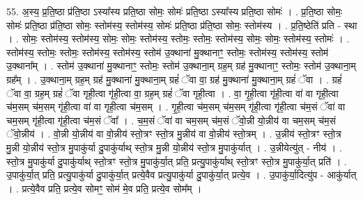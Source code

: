 \documentclass[17pt]{extarticle}
\begin{document}
55. अ॒स्य॒ प्र॒ति॒ष्ठा प्र॑ति॒ष्ठा ऽस्या᳚स्य प्रति॒ष्ठा सोमः॒ सोमः॑ प्रति॒ष्ठा ऽस्या᳚स्य प्रति॒ष्ठा सोमः॑ । . प्र॒ति॒ष्ठा सोमः॒ सोमः॑ प्रति॒ष्ठा प्र॑ति॒ष्ठा सोमः॒ स्तोम॑स्य॒ स्तोम॑स्य॒ सोमः॑ प्रति॒ष्ठा प्र॑ति॒ष्ठा सोमः॒ स्तोम॑स्य । . प्र॒ति॒ष्ठेति॑ प्रति - स्था । . सोमः॒ स्तोम॑स्य॒ स्तोम॑स्य॒ सोमः॒ सोमः॒ स्तोम॑स्य॒ स्तोमः॒ स्तोमः॒ स्तोम॑स्य॒ सोमः॒ सोमः॒ स्तोम॑स्य॒ स्तोमः॑ । . स्तोम॑स्य॒ स्तोमः॒ स्तोमः॒ स्तोम॑स्य॒ स्तोम॑स्य॒ स्तोम॑ उ॒क्थाना॑ मु॒क्थानाꣳ॒॒ स्तोमः॒ स्तोम॑स्य॒ स्तोम॑स्य॒ स्तोम॑ उ॒क्थाना᳚म् । . स्तोम॑ उ॒क्थाना॑ मु॒क्थानाꣳ॒॒ स्तोमः॒ स्तोम॑ उ॒क्थाना॒म् ग्रह॒म् ग्रह॑ मु॒क्थानाꣳ॒॒ स्तोमः॒ स्तोम॑ उ॒क्थाना॒म् ग्रह᳚म् । . उ॒क्थाना॒म् ग्रह॒म् ग्रह॑ मु॒क्थाना॑ मु॒क्थाना॒म् ग्रहं॑ ॅवा वा॒ ग्रह॑ मु॒क्थाना॑ मु॒क्थाना॒म् ग्रहं॑ ॅवा । . ग्रहं॑ ॅवा वा॒ ग्रह॒म् ग्रहं॑ ॅवा गृही॒त्वा गृ॑ही॒त्वा वा॒ ग्रह॒म् ग्रहं॑ ॅवा गृही॒त्वा । . वा॒ गृ॒ही॒त्वा गृ॑ही॒त्वा वा॑ वा गृही॒त्वा च॑म॒सम् च॑म॒सम् गृ॑ही॒त्वा वा॑ वा गृही॒त्वा च॑म॒सम् । . गृ॒ही॒त्वा च॑म॒सम् च॑म॒सम् गृ॑ही॒त्वा गृ॑ही॒त्वा च॑म॒सं ॅवा॑ वा चम॒सम् गृ॑ही॒त्वा गृ॑ही॒त्वा च॑म॒सं ॅवा᳚ । . च॒म॒सं ॅवा॑ वा चम॒सम् च॑म॒सं ॅवो॒न्नी यो॒न्नीय॑ वा चम॒सम् च॑म॒सं ॅवो॒न्नीय॑ । . वो॒न्नी यो॒न्नीय॑ वा वो॒न्नीय॑ स्तो॒त्रꣳ स्तो॒त्र मु॒न्नीय॑ वा वो॒न्नीय॑ स्तो॒त्रम् । . उ॒न्नीय॑ स्तो॒त्रꣳ स्तो॒त्र मु॒न्नी यो॒न्नीय॑ स्तो॒त्र मु॒पाकु॑र्या दु॒पाकु॑र्याथ् स्तो॒त्र मु॒न्नी यो॒न्नीय॑ स्तो॒त्र मु॒पाकु॑र्यात् । . उ॒न्नीयेत्यु॑त् - नीय॑ । . स्तो॒त्र मु॒पाकु॑र्या दु॒पाकु॑र्याथ् स्तो॒त्रꣳ स्तो॒त्र मु॒पाकु॑र्या॒त् प्रति॒ प्रत्यु॒पाकु॑र्याथ् स्तो॒त्रꣳ स्तो॒त्र मु॒पाकु॑र्या॒त् प्रति॑ । . उ॒पाकु॑र्या॒त् प्रति॒ प्रत्यु॒पाकु॑र्या दु॒पाकु॑र्या॒त् प्रत्ये॒वैव प्रत्यु॒पाकु॑र्या दु॒पाकु॑र्या॒त् प्रत्ये॒व । . उ॒पाकु॑र्या॒दित्यु॑प - आकु॑र्यात् । . प्रत्ये॒वैव प्रति॒ प्रत्ये॒व सोमꣳ॒॒ सोम॑ मे॒व प्रति॒ प्रत्ये॒व सोम᳚म् । \newline
\end{document}
